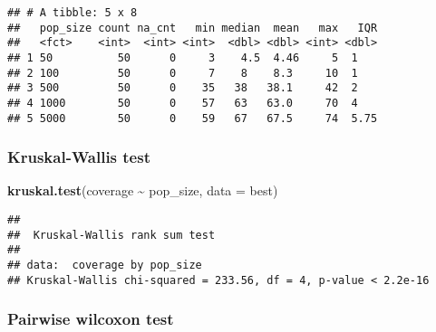 \documentclass[
]{book}
\newenvironment{Shaded}{\begin{snugshade}}{\end{snugshade}}
\newcommand{\AttributeTok}[1]{\textcolor[rgb]{0.13,0.29,0.53}{#1}}
\newcommand{\ConstantTok}[1]{\textcolor[rgb]{0.56,0.35,0.01}{#1}}
\newcommand{\FunctionTok}[1]{\textcolor[rgb]{0.13,0.29,0.53}{\textbf{#1}}}
\newcommand{\NormalTok}[1]{#1}
\newcommand{\SpecialCharTok}[1]{\textcolor[rgb]{0.81,0.36,0.00}{\textbf{#1}}}
\newcommand{\StringTok}[1]{\textcolor[rgb]{0.31,0.60,0.02}{#1}}
\begin{document}
\begin{verbatim}
## # A tibble: 5 x 8
##   pop_size count na_cnt   min median  mean   max   IQR
##   <fct>    <int>  <int> <int>  <dbl> <dbl> <int> <dbl>
## 1 50          50      0     3    4.5  4.46     5  1   
## 2 100         50      0     7    8    8.3     10  1   
## 3 500         50      0    35   38   38.1     42  2   
## 4 1000        50      0    57   63   63.0     70  4   
## 5 5000        50      0    59   67   67.5     74  5.75
\end{verbatim}

\hypertarget{kruskal-wallis-test-4}{%
\subsubsection{Kruskal-Wallis test}\label{kruskal-wallis-test-4}}

\begin{Shaded}
\begin{Highlighting}[]
\FunctionTok{kruskal.test}\NormalTok{(coverage }\SpecialCharTok{\textasciitilde{}}\NormalTok{ pop\_size, }\AttributeTok{data =}\NormalTok{ best)}
\end{Highlighting}
\end{Shaded}

\begin{verbatim}
## 
##  Kruskal-Wallis rank sum test
## 
## data:  coverage by pop_size
## Kruskal-Wallis chi-squared = 233.56, df = 4, p-value < 2.2e-16
\end{verbatim}

\hypertarget{pairwise-wilcoxon-test-4}{%
\subsubsection{Pairwise wilcoxon test}\label{pairwise-wilcoxon-test-4}}

\begin{Shaded}
\end{Shaded}
\end{document}
